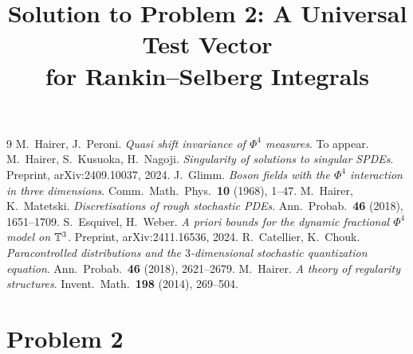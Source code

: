 \documentclass[11pt]{article}
\begin{document}
\begin{thebibliography}{9}
 M.~Hairer, J.~Peroni.
  \emph{Quasi shift invariance of $\Phi^4$ measures}. To appear.
 M.~Hairer, S.~Kusuoka, H.~Nagoji.
  \emph{Singularity of solutions to singular SPDEs}.
  Preprint, arXiv:2409.10037, 2024.
 J.~Glimm.
  \emph{Boson fields with the $\Phi^4$ interaction in three dimensions}.
  Comm.\ Math.\ Phys.\ \textbf{10} (1968), 1--47.
 M.~Hairer, K.~Matetski.
  \emph{Discretisations of rough stochastic PDEs}.
  Ann.\ Probab.\ \textbf{46} (2018), 1651--1709.
 S.~Esquivel, H.~Weber.
  \emph{A priori bounds for the dynamic fractional $\Phi^4$ model on $\mathbb{T}^3$}.
  Preprint, arXiv:2411.16536, 2024.
 R.~Catellier, K.~Chouk.
  \emph{Paracontrolled distributions and the $3$-dimensional stochastic
  quantization equation}. Ann.\ Probab.\ \textbf{46} (2018), 2621--2679.
 M.~Hairer.
  \emph{A theory of regularity structures}. Invent.\ Math.\ \textbf{198} (2014),
  269--504.
\end{thebibliography}

\endgroup

\clearpage
\section*{Problem 2}
\begingroup
\hypersetup{colorlinks=true,
            linkcolor=blue!50!black,
            citecolor=blue!50!black,
            urlcolor=blue!50!black}
\newcommand{\qtwoF}{F}
\newcommand{\qtwooo}{\mathfrak{o}}
\newcommand{\qtwopp}{\mathfrak{p}}
\newcommand{\qtwoqq}{\mathfrak{q}}
\newcommand{\qtwoC}{\mathbb{C}}
\newcommand{\qtwoZ}{\mathbb{Z}}
\newcommand{\qtwoGL}{\mathrm{GL}}
\newcommand{\qtwoMn}{M_n}
\newcommand{\qtwoSe}{\mathcal{S}_{\mathrm e}}
\newcommand{\qtwoSw}{\mathcal{S}}
\newcommand{\qtwoW}{\mathcal{W}}
\newcommand{\qtwovol}{\operatorname{vol}}
\newcommand{\qtwodiag}{\operatorname{diag}}
\newcommand{\qtwotr}{\operatorname{trace}}
\newcommand{\qtwottilde}[1]{\widetilde{#1}}
\newcommand{\qtwolRS}{\ell_{\mathrm{RS}}}
\newtheorem{qtwotheorem}{Theorem}
\newtheorem{qtwolemma}{Lemma}
\newtheorem{qtwoproposition}{Proposition}
\newtheorem{qtwocorollary}{Corollary}
\title{Solution to Problem 2: A Universal Test Vector\\
for Rankin--Selberg Integrals}
\author{}
\date{}
\maketitle
\end{document}
